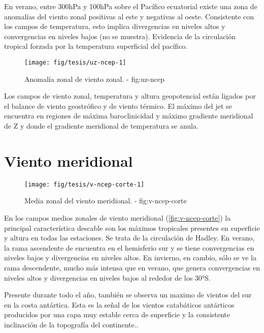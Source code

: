 \documentclass[spanish,a4paper]{book}
\begin{document}
En verano, entre 300hPa y 100hPa sobre el Pacífico ecuatorial existe una
zona de anomalías del viento zonal positivas al este y negativas al
oeste. Consistente con los campos de temperatura, esto implica
divergencias en niveles altos y convergencias en niveles bajos (no se
muestra). Evidencia de la circulación tropical forzada por la
temperatura superficial del pacífico.

\begin{landscape}\begin{figure}

{\centering \texttt{[image: fig/tesis/uz-ncep-1]} 

}

\caption{Anomalía zonal de viento zonal. - fig:uz-ncep}\label{fig:uz-ncep}
\end{figure}
\end{landscape}

Los campos de viento zonal, temperatura y altura geopotencial están
ligados por el balance de viento geostrófico y de viento térmico. El
máximo del jet se encuentra en regiones de máxima baroclinicidad y
máximo gradiente meridional de Z y donde el gradiente meridional de
temperatura se anula.

\section{Viento meridional}\label{viento-meridional}

\begin{figure}

{\centering \texttt{[image: fig/tesis/v-ncep-corte-1]} 

}

\caption{Media zonal del viento meridional. - fig:v-ncep-corte}\label{fig:v-ncep-corte}
\end{figure}

En los campos medios zonales de viento meridional
(\autoref{fig:v-ncep-corte}) la principal característica descable son
los máximos tropicales presentes en superficie y altura en todas las
estaciones. Se trata de la circulación de Hadley. En verano, la rama
ascendente de encuentra en el hemisferio sur y se tiene convergencias en
niveles bajos y divergencias en niveles altos. En invierno, en cambio,
sólo se ve la rama descendente, mucho más intensa que en verano, que
genera convergencias en niveles altos y divergencias en niveles bajos al
rededor de los 30°S.

Presente durante todo el año, también se observa un maximo de vientos
del sur en la costa antártica. Esta es la señal de los vientos
catabáticos antárticos producidos por una capa muy estable cerca de
superficie y la consistente inclinación de la topografía del
continente..
\end{document}
